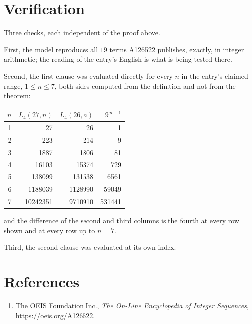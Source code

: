 \documentclass[11pt,a4paper]{article}
\theoremstyle{plain}
\theoremstyle{definition}
\begin{document}
\section{Verification}

Three checks, each independent of the proof above.

First, the model reproduces all $19$ terms A126522 publishes, exactly, in integer
arithmetic; the reading of the entry's English is what is being tested there.

Second, the first clause was evaluated directly for every $n$ in the entry's claimed range,
$1\le n\le7$, both sides computed from the definition and not from the theorem:

\begin{center}
\begin{tabular}{rrrr}
$n$ & $L_{4}(27,n)$ & $L_{4}(26,n)$ & $9^{\,n-1}$ \\ \hline
1 & 27 & 26 & 1 \\
2 & 223 & 214 & 9 \\
3 & 1887 & 1806 & 81 \\
4 & 16103 & 15374 & 729 \\
5 & 138099 & 131538 & 6561 \\
6 & 1188039 & 1128990 & 59049 \\
7 & 10242351 & 9710910 & 531441 \\
\end{tabular}
\end{center}

\noindent and the difference of the second and third columns is the fourth at every row shown
and at every row up to $n=7$.

Third, the second clause was evaluated at its own index.

\section*{References}
\begin{enumerate}
\item The OEIS Foundation Inc., \emph{The On-Line Encyclopedia of Integer Sequences},
\url{https://oeis.org/A126522}.
\end{enumerate}
\end{document}
